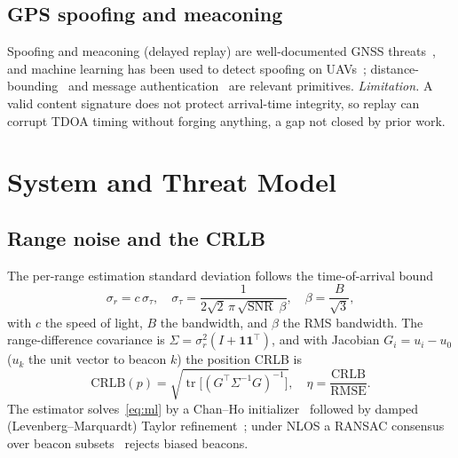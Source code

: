 \documentclass[journal]{IEEEtran}
\begin{document}
\subsection{GPS spoofing and meaconing}
Spoofing and meaconing (delayed replay) are well-documented GNSS
threats~\cite{ref24,ref25}, and machine learning has been used to detect
spoofing on UAVs~\cite{ref14}; distance-bounding~\cite{ref23} and message
authentication~\cite{ref21} are relevant primitives. \emph{Limitation.} A valid
content signature does not protect arrival-time integrity, so replay can
corrupt TDOA timing without forging anything, a gap not closed by prior work.

\section{System and Threat Model}\label{sec:model}
\subsection{Range noise and the CRLB}
The per-range estimation standard deviation follows the time-of-arrival
bound~\cite{ref27}
\begin{equation}
\sigma_r = c\,\sigma_\tau, \quad
\sigma_\tau = \frac{1}{2\sqrt{2}\,\pi\,\sqrt{\mathrm{SNR}}\;\beta},
\quad \beta = \frac{B}{\sqrt3},
\label{eq:sigma}
\end{equation}
with $c$ the speed of light, $B$ the bandwidth, and $\beta$ the RMS bandwidth.
The range-difference covariance is
$\Sigma=\sigma_r^2(I+\mathbf{1}\mathbf{1}^\top)$, and with Jacobian
$G_{i}=u_i-u_0$ ($u_k$ the unit vector to beacon $k$) the position CRLB is
\begin{equation}
\mathrm{CRLB}(p) = \sqrt{\operatorname{tr}\!\big[(G^\top\Sigma^{-1}G)^{-1}\big]},
\quad
\eta = \frac{\mathrm{CRLB}}{\mathrm{RMSE}} .
\label{eq:crlb}
\end{equation}
The estimator solves~\eqref{eq:ml} by a Chan--Ho initializer~\cite{ref6}
followed by damped (Levenberg--Marquardt) Taylor refinement~\cite{ref8}; under
NLOS a RANSAC consensus over beacon subsets~\cite{ref28,ref38} rejects biased
beacons.
\end{document}
